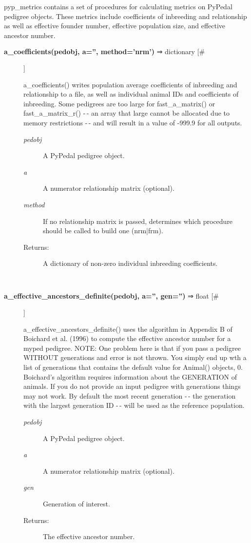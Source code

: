 \par pyp\_metrics contains a set of procedures for calculating metrics on PyPedal
pedigree objects.  These metrics include coefficients of inbreeding and
relationship as well as effective founder number, effective population size,
and effective ancestor number.
\begin{description}
\item[\textbf{a\_coefficients(pedobj, a='', method='nrm')} ⇒ dictionary [\#]
]
\par a\_coefficients() writes population average coefficients of inbreeding and
relationship to a file, as well as individual animal IDs and coefficients of
inbreeding.  Some pedigrees are too large for fast\_a\_matrix() or fast\_a\_matrix\_r()
-$\,$- an array that large cannot be allocated due to memory restrictions -$\,$- and will
result in a value of -999.9 for all outputs.
\begin{description}
\item[\textit{pedobj}
]
A PyPedal pedigree object.
\item[\textit{a}
]
A numerator relationship matrix (optional).
\item[\textit{method}
]
If no relationship matrix is passed, determines which procedure should be called to build one (nrm|frm).
\item[Returns:
]
A dictionary of non-zero individual inbreeding coefficients.
\end{description}\\

\item[\textbf{a\_effective\_ancestors\_definite(pedobj, a='', gen='')} ⇒ float [\#]
]
\par a\_effective\_ancestors\_definite() uses the algorithm in Appendix B of Boichard et al.
(1996) to compute the effective ancestor number for a myped pedigree.
NOTE: One problem here is that if you pass a pedigree WITHOUT generations and error
is not thrown.  You simply end up wth a list of generations that contains the default
value for Animal() objects, 0.
Boichard's algorithm requires information about the GENERATION of animals.  If you
do not provide an input pedigree with generations things may not work.  By default
the most recent generation -$\,$- the generation with the largest generation ID -$\,$- will
be used as the reference population.
\begin{description}
\item[\textit{pedobj}
]
A PyPedal pedigree object.
\item[\textit{a}
]
A numerator relationship matrix (optional).
\item[\textit{gen}
]
Generation of interest.
\item[Returns:
]
The effective ancestor number.
\end{description}\\


\end{description}
